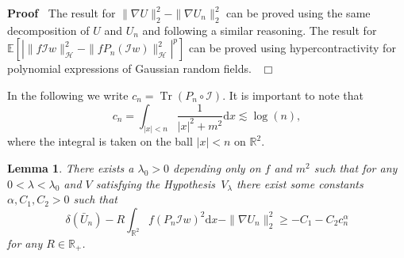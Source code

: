 \documentclass[a4paper,10pt]{article}
\newcommand{\mathd}{\mathrm{d}}
\newcommand{\tmop}[1]{\ensuremath{\operatorname{#1}}}
\newenvironment{proof}{\noindent\textbf{Proof\ }}{\hspace*{\fill}$\Box$\medskip}
\newtheorem{lemma}[theorem]{Lemma}
\begin{document}
\begin{proof}
  The result for $\| \nabla U \|^2_2 - \| \nabla U_n \|^2_2$ can be proved
  using the same decomposition of $U$ and $U_n$ and following a similar
  reasoning. The result for $\mathbb{E} [| \| f\mathcal{I}w\|^2_{\mathcal{H}}
  -\|f P_n (\mathcal{I}w) \|^2_{\mathcal{H}} |^p]$ can be proved using
  hypercontractivity for polynomial expressions of Gaussian random fields. \ 
\end{proof}

In the following we write $c_n = \tmop{Tr} (P_n \circ \mathcal{I})$. It is
important to note that
\[ c_n = \int_{| x | < n} \frac{1}{| x |^2 + m^2} \mathd x \lesssim \log (n),
\]
where the integral is taken on the ball $| x | < n$ on $\mathbb{R}^2$.

\begin{lemma}
  \label{lemma_inequality3}There exists a $\lambda_0 > 0$ depending only on
  $f$ and $m^2$ such that for any $0 < \lambda < \lambda_0$ and $V$ satisfying
  the Hypothesis~$V_{\lambda}$ there exist some constants $\alpha, C_1, C_2 >
  0$ such that
  \[ \delta (\bar{U}_n) - R \int_{\mathbb{R}^2} f (P_n \mathcal{I}w)^2 \mathd
     x -\| \nabla U_n \|^2_2 \geqslant - C_1 - C_2 c_n^{\alpha} \]
  for any $R \in \mathbb{R}_+$.
\end{lemma}
\end{document}
